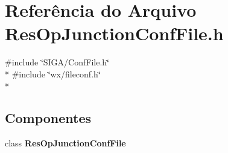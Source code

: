 \section{Referência do Arquivo Res\+Op\+Junction\+Conf\+File.\+h}
\label{_res_op_junction_conf_file_8h}
{\ttfamily \#include \char`\"{}S\+I\+G\+A/\+Conf\+File.\+h\char`\"{}}\\*
{\ttfamily \#include \char`\"{}wx/fileconf.\+h\char`\"{}}\\*
\subsection*{Componentes}
\begin{DoxyCompactItemize}
\item 
class {\bf Res\+Op\+Junction\+Conf\+File}
\end{DoxyCompactItemize}
